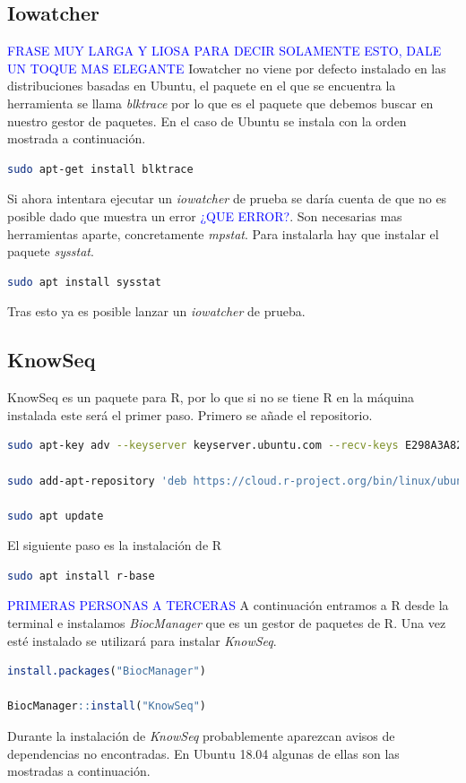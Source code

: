\subsection{Iowatcher}
\textcolor{blue}{FRASE MUY LARGA Y LIOSA PARA DECIR SOLAMENTE ESTO, DALE UN TOQUE MAS ELEGANTE} Iowatcher no viene por defecto instalado en las distribuciones basadas en Ubuntu, el paquete en el que se encuentra la herramienta se llama \textit{blktrace} por lo que es el paquete que debemos buscar en nuestro gestor de paquetes. En el caso de Ubuntu se instala con la orden mostrada a continuación.
\begin{lstlisting}[language=bash]
sudo apt-get install blktrace
\end{lstlisting}
Si ahora intentara ejecutar un \textit{iowatcher} de prueba se daría cuenta de que no es posible dado que muestra un error \textcolor{blue}{¿QUE ERROR?}. Son necesarias mas herramientas aparte, concretamente \textit{mpstat}. Para instalarla hay que instalar el paquete \textit{sysstat}.
\begin{lstlisting}[language=bash]
sudo apt install sysstat
\end{lstlisting}
Tras esto ya es posible lanzar un \textit{iowatcher} de prueba.

\subsection{KnowSeq}
KnowSeq es un paquete para R, por lo que si no se tiene R en la máquina instalada este será el primer paso. Primero se añade el repositorio.
\begin{lstlisting}[language=bash]
sudo apt-key adv --keyserver keyserver.ubuntu.com --recv-keys E298A3A825C0D65DFD57CBB651716619E084DAB9

sudo add-apt-repository 'deb https://cloud.r-project.org/bin/linux/ubuntu bionic-cran40/'

sudo apt update
\end{lstlisting}
El siguiente paso es la instalación de R
\begin{lstlisting}[language=bash]
sudo apt install r-base
\end{lstlisting}
\textcolor{blue}{PRIMERAS PERSONAS A TERCERAS} A continuación entramos a R desde la terminal e instalamos \textit{BiocManager} que es un gestor de paquetes de R. Una vez esté instalado se utilizará para instalar \textit{KnowSeq}.
\begin{lstlisting}[language=R]
install.packages("BiocManager")

BiocManager::install("KnowSeq")
\end{lstlisting}
Durante la instalación de \textit{KnowSeq} probablemente aparezcan avisos de dependencias no encontradas. En Ubuntu 18.04 algunas de ellas son las mostradas a continuación.

